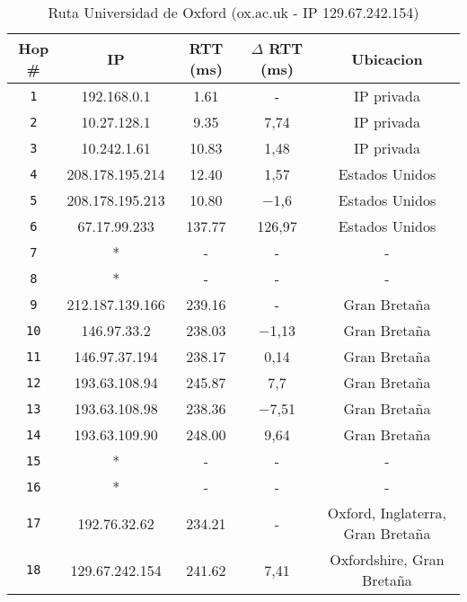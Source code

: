 \begin{table}[ht]\begin{center}
    \begin{tabular}{|c|c|c|c|c|}
    \hline
    \textbf{Hop \#} & \textbf{IP}& \textbf{RTT (ms)} & \textbf{$\Delta$ RTT (ms)} & \textbf{Ubicacion} \\ \hline
    \texttt{1} & 192.168.0.1      &1.61       & -       & IP privada   \\ \hline
    \texttt{2} & 10.27.128.1      &9.35       & 7,74       & IP privada  \\ \hline
    \texttt{3} & 10.242.1.61      & 10.83     & 1,48       & IP privada  \\ \hline
    \texttt{4} & 208.178.195.214  & 12.40     & 1,57       & Estados Unidos   \\ \hline
    \texttt{5} & 208.178.195.213  & 10.80     & −1,6       & Estados Unidos   \\ \hline
    \texttt{6} & 67.17.99.233     & 137.77    & 126,97       & Estados Unidos    \\ \hline
    \texttt{7} & *                & -        & -       & -   \\ \hline
    \texttt{8} & *                & -        & -       & -   \\ \hline
    \texttt{9} & 212.187.139.166  & 239.16    & -       & Gran Bretaña   \\ \hline
    \texttt{10} & 146.97.33.2     & 238.03    & −1,13       & Gran Bretaña   \\ \hline
    \texttt{11} & 146.97.37.194   & 238.17    & 0,14       & Gran Bretaña    \\ \hline
    \texttt{12} & 193.63.108.94   & 245.87    & 7,7       &  Gran Bretaña \\ \hline
    \texttt{13} & 193.63.108.98   & 238.36    & −7,51       & Gran Bretaña   \\ \hline
    \texttt{14} & 193.63.109.90   & 248.00    & 9,64       & Gran Bretaña    \\ \hline
    \texttt{15} & *               & -        & -       & -   \\ \hline
    \texttt{16} & *               & -        & -       & -    \\ \hline
    \texttt{17} & 192.76.32.62    & 234.21    & -       & Oxford, Inglaterra, Gran Bretaña   \\ \hline
    \texttt{18} & 129.67.242.154  & 241.62    & 7,41       & Oxfordshire, Gran Bretaña   \\ \hline
    \end{tabular}
    \caption{Ruta Universidad de Oxford (ox.ac.uk - IP 129.67.242.154)}
\end{center}\end{table}

